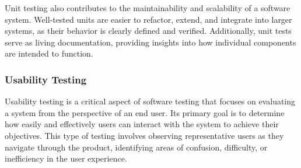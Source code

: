 Unit testing also contributes to the maintainability and scalability of a software system. Well-tested units are easier to refactor, extend, and integrate into larger systems, as their behavior is clearly defined and verified. Additionally, unit tests serve as living documentation, providing insights into how individual components are intended to function.

\subsubsection*{Usability Testing}




Usability testing is a critical aspect of software testing that focuses on evaluating a system from the perspective of an end user. Its primary goal is to determine how easily and effectively users can interact with the system to achieve their objectives. This type of testing involves observing representative users as they navigate through the product, identifying areas of confusion, difficulty, or inefficiency in the user experience. \cite{geeksforgeeks:user-test} \\

